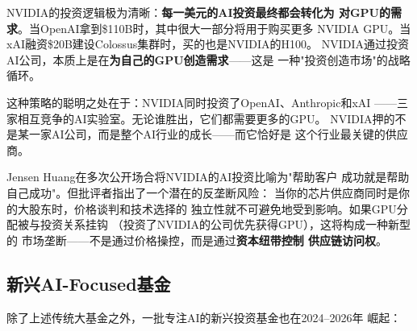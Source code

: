 NVIDIA的投资逻辑极为清晰：\textbf{每一美元的AI投资最终都会转化为
对GPU的需求}。当OpenAI拿到\$110B时，其中很大一部分将用于购买更多
NVIDIA GPU。当xAI融资\$20B建设Colossus集群时，买的也是NVIDIA的H100。
NVIDIA通过投资AI公司，本质上是在\textbf{为自己的GPU创造需求}——这是
一种"投资创造市场"的战略循环。

这种策略的聪明之处在于：NVIDIA同时投资了OpenAI、Anthropic和xAI
——三家相互竞争的AI实验室。无论谁胜出，它们都需要更多的GPU。
NVIDIA押的不是某一家AI公司，而是整个AI行业的成长——而它恰好是
这个行业最关键的供应商。

Jensen Huang在多次公开场合将NVIDIA的AI投资比喻为"帮助客户
成功就是帮助自己成功"。但批评者指出了一个潜在的反垄断风险：
当你的芯片供应商同时是你的大股东时，价格谈判和技术选择的
独立性就不可避免地受到影响。如果GPU分配被与投资关系挂钩
（投资了NVIDIA的公司优先获得GPU），这将构成一种新型的
市场垄断——不是通过价格操控，而是通过\textbf{资本纽带控制
供应链访问权}。

\subsection{新兴AI-Focused基金}
\label{subsec:fund-emerging}

除了上述传统大基金之外，一批专注AI的新兴投资基金也在2024--2026年
崛起：

